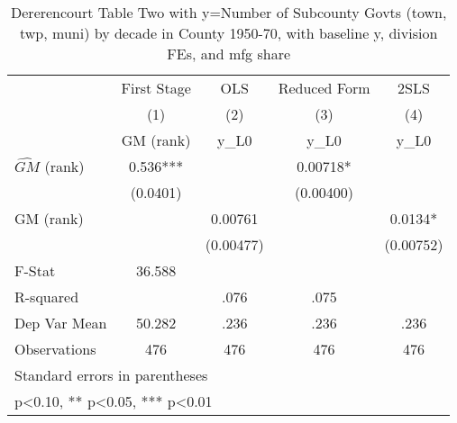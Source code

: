 \begin{table}[htbp]\centering
\def\sym#1{\ifmmode^{#1}\else\(^{#1}\)\fi}
\caption{Dererencourt Table Two with y=Number of Subcounty Govts (town, twp, muni) by decade in County 1950-70, with baseline y, division FEs, and mfg share}
\begin{tabular}{l*{4}{c}}
\toprule
                    & First Stage   &         OLS   &Reduced Form   &        2SLS   \\
                    &\multicolumn{1}{c}{(1)}&\multicolumn{1}{c}{(2)}&\multicolumn{1}{c}{(3)}&\multicolumn{1}{c}{(4)}\\
                    &\multicolumn{1}{c}{GM  (rank)}&\multicolumn{1}{c}{y\_L0}&\multicolumn{1}{c}{y\_L0}&\multicolumn{1}{c}{y\_L0}\\
\midrule
$\hat{GM}$ (rank)   &       0.536***&               &     0.00718*  &               \\
                    &    (0.0401)   &               &   (0.00400)   &               \\
\addlinespace
GM  (rank)          &               &     0.00761   &               &      0.0134*  \\
                    &               &   (0.00477)   &               &   (0.00752)   \\
\midrule
F-Stat              &      36.588   &               &               &               \\
R-squared           &               &        .076   &        .075   &               \\
Dep Var Mean        &      50.282   &        .236   &        .236   &        .236   \\
Observations        &         476   &         476   &         476   &         476   \\
\bottomrule
\multicolumn{5}{l}{\footnotesize Standard errors in parentheses}\\
\multicolumn{5}{l}{\footnotesize * p<0.10, ** p<0.05, *** p<0.01}\\
\end{tabular}
\end{table}
